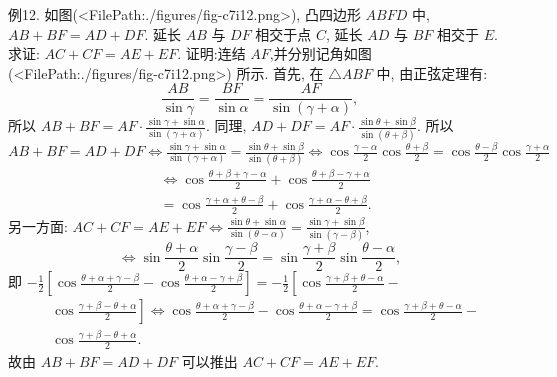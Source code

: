 例12. 如图(<FilePath:./figures/fig-c7i12.png>), 凸四边形 $A B F D$ 中, $A B+ B F=A D+D F$. 延长 $A B$ 与 $D F$ 相交于点 $C$, 延长 $A D$ 与 $B F$ 相交于 $E$. 求证: $A C+C F=A E+E F$.
证明:连结 $A F$,并分别记角如图(<FilePath:./figures/fig-c7i12.png>) 所示.
首先, 在 $\triangle A B F$ 中, 由正弦定理有:
$$
\frac{A B}{\sin \gamma}=\frac{B F}{\sin \alpha}=\frac{A F}{\sin (\gamma+\alpha)},
$$
所以 $A B+B F=A F \cdot \frac{\sin \gamma+\sin \alpha}{\sin (\gamma+\alpha)}$.
同理, $A D+D F=A F \cdot \frac{\sin \theta+\sin \beta}{\sin (\theta+\beta)}$.
所以 $A B+B F=A D+D F \Leftrightarrow \frac{\sin \gamma+\sin \alpha}{\sin (\gamma+\alpha)}=\frac{\sin \theta+\sin \beta}{\sin (\theta+\beta)}\Leftrightarrow \cos \frac{\gamma-\alpha}{2} \cos \frac{\theta+\beta}{2}=\cos \frac{\theta-\beta}{2} \cos \frac{\gamma+\alpha}{2}$
$$
\begin{aligned}
& \Leftrightarrow \cos \frac{\theta+\beta+\gamma-\alpha}{2}+\cos \frac{\theta+\beta-\gamma+\alpha}{2} \\
& =\cos \frac{\gamma+\alpha+\theta-\beta}{2}+\cos \frac{\gamma+\alpha-\theta+\beta}{2} .
\end{aligned}
$$
另一方面: $A C+C F=A E+E F \Leftrightarrow \frac{\sin \theta+\sin \alpha}{\sin (\theta-\alpha)}=\frac{\sin \gamma+\sin \beta}{\sin (\gamma-\beta)}$,
$$
\Leftrightarrow \sin \frac{\theta+\alpha}{2} \sin \frac{\gamma-\beta}{2}=\sin \frac{\gamma+\beta}{2} \sin \frac{\theta-\alpha}{2},
$$
即 $-\frac{1}{2}\left[\cos \frac{\theta+\alpha+\gamma-\beta}{2}-\cos \frac{\theta+\alpha-\gamma+\beta}{2}\right]=-\frac{1}{2}\left[\cos \frac{\gamma+\beta+\theta-\alpha}{2}-\right.$
$$
\begin{aligned}
& \left.\cos \frac{\gamma+\beta-\theta+\alpha}{2}\right] \Leftrightarrow \cos \frac{\theta+\alpha+\gamma-\beta}{2}-\cos \frac{\theta+\alpha-\gamma+\beta}{2}=\cos \frac{\gamma+\beta+\theta-\alpha}{2}- \\
& \cos \frac{\gamma+\beta-\theta+\alpha}{2} .
\end{aligned}
$$
故由 $A B+B F=A D+D F$ 可以推出 $A C+C F=A E+E F$.




